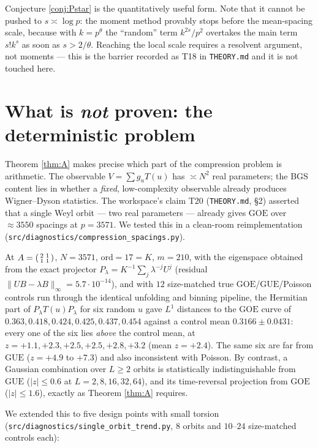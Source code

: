 \documentclass[11pt,reqno]{amsart}
\theoremstyle{definition}
\newcommand{\GUE}{\mathrm{GUE}}
\newcommand{\GOE}{\mathrm{GOE}}
\begin{document}
Conjecture \ref{conj:Pstar} is the quantitatively useful form. Note that it
cannot be pushed to $s\asymp\log p$: the moment method provably stops before the
mean-spacing scale, because with $k=p^{\theta}$ the ``random'' term $k^{2s}/p^2$
overtakes the main term $s!k^s$ as soon as $s>2/\theta$. Reaching the local scale
requires a resolvent argument, not moments --- this is the barrier recorded as
T18 in \texttt{THEORY.md} and it is not touched here.

\section{What is \emph{not} proven: the deterministic problem}\label{sec:open}

Theorem \ref{thm:A} makes precise which part of the compression problem is
arithmetic. The observable $V=\sum g_uT(u)$ has $\asymp N^2$ real parameters; the
BGS content lies in whether a \emph{fixed}, low-complexity observable already
produces Wigner--Dyson statistics. The workspace's claim T20
(\texttt{THEORY.md}, \S2) asserted that a single Weyl orbit --- two real
parameters --- already gives $\GOE$ over $\approx3550$ spacings at $p=3571$. We
tested this in a clean-room reimplementation
(\texttt{src/diagnostics/compression\_spacings.py}).

At $A=\begin{psmallmatrix}2&1\\1&1\end{psmallmatrix}$, $N=3571$,
$\mathrm{ord}=17=K$, $m=210$, with the eigenspace obtained from the exact
projector $P_\lambda=K^{-1}\sum_j\lambda^{-j}U^j$ (residual
$\|U B-\lambda B\|_\infty=5.7\cdot10^{-14}$), and with $12$ size-matched true
$\GOE$/$\GUE$/Poisson controls run through the identical unfolding and binning
pipeline, the Hermitian part of $P_\lambda T(u)P_\lambda$ for six random $u$ gave
$L^1$ distances to the $\GOE$ curve of
$0.363,0.418,0.424,0.425,0.437,0.454$ against a control mean
$0.3166\pm0.0431$: every one of the six lies \emph{above} the control mean, at
$z=+1.1,+2.3,+2.5,+2.5,+2.8,+3.2$ (mean $z=+2.4$). The same six are far from
$\GUE$ ($z=+4.9$ to $+7.3$) and also inconsistent with Poisson. By contrast, a
Gaussian combination over $L\ge2$ orbits is statistically indistinguishable from
$\GUE$ ($|z|\le0.6$ at $L=2,8,16,32,64$), and its time-reversal projection from
$\GOE$ ($|z|\le1.6$), exactly as Theorem \ref{thm:A} requires.

We extended this to five design points with small torsion
(\texttt{src/diagnostics/single\_orbit\_trend.py}, $8$ orbits and $10$--$24$ size-matched
controls each):
\end{document}

